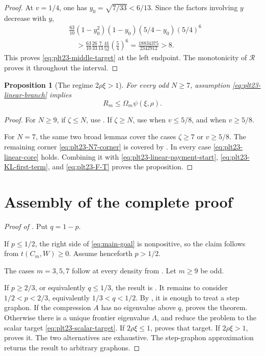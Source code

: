 \documentclass[11pt]{article}
\newtheorem{proposition}[theorem]{Proposition}
\numberwithin{equation}{section}
\begin{document}
\begin{proof}
  At $v=1/4$, one has $y_0=\sqrt{7/33}<6/13$.
  Since the factors involving $y$ decrease with $y$,
  \begin{align*}
    &\frac{63}{10}(1-y_0^2)(1-y_0)(5/4-y_0)(5/4)^6\\
    &\quad>
    \frac{63}{10}\frac{26}{33}\frac{7}{13}\frac{41}{52}
    \left(\frac{5}{4}\right)^6
    =\frac{18834375}{2342912}>8.
  \end{align*}
  This proves \eqref{eq:plt23-middle-target} at the left endpoint.
  The monotonicity of $\mathcal R$ proves it throughout the interval.
\end{proof}

\begin{proposition}[The regime $2\rho\xi>1$]\label{prop:plt23-linear-branch}
  For every odd $N\ge7$, assumption \eqref{eq:plt23-linear-branch} implies
  \[
    R_m\le \Omega_m\psi(\xi,\rho).
  \]
\end{proposition}

\begin{proof}
  For $N\ge9$, if $\zeta\le N$, use .
  If $\zeta\ge N$, use  when $v\le5/8$, and  when $v\ge5/8$.

  For $N=7$, the same two broad lemmas cover the cases $\zeta\ge7$ or $v\ge5/8$.
  The remaining corner \eqref{eq:plt23-N7-corner} is covered by .
  In every case \eqref{eq:plt23-linear-core} holds.
  Combining it with \eqref{eq:plt23-linear-payment-start}, \eqref{eq:plt23-KL-first-term}, and \eqref{eq:plt23-F-T} proves the proposition.
\end{proof}


\section{Assembly of the complete proof}\label{sec:assembly}

\begin{proof}[Proof of ]
  Put $q=1-p$.

  If $p\le1/2$, the right side of \eqref{eq:main-goal} is nonpositive, so the claim follows from $t(C_m,W)\ge0$.
  Assume henceforth $p>1/2$.

  The cases $m=3,5,7$ follow at every density from .
  Let $m\ge9$ be odd.

  If $p\ge2/3$, or equivalently $q\le1/3$, the result is .
  It remains to consider $1/2<p<2/3$, equivalently $1/3<q<1/2$.
  By , it is enough to treat a step graphon.
  If the compression $A$ has no eigenvalue above $q$,  proves the theorem.
  Otherwise there is a unique frontier eigenvalue $\Lambda$, and  reduce the problem to the scalar target \eqref{eq:plt23-scalar-target}.
  If $2\rho\xi\le1$,  proves that target.
  If $2\rho\xi>1$,  proves it.
  The two alternatives are exhaustive.
  The step-graphon approximation returns the result to arbitrary graphons.
\end{proof}
\end{document}
